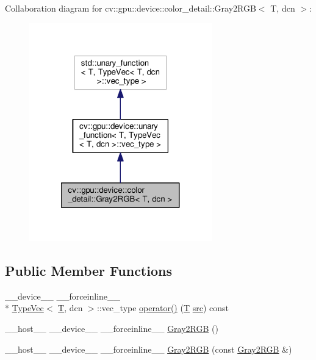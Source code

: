 Collaboration diagram for cv\-:\-:gpu\-:\-:device\-:\-:color\-\_\-detail\-:\-:Gray2\-R\-G\-B$<$ T, dcn $>$\-:\nopagebreak
\begin{figure}[H]
\begin{center}
\leavevmode
\includegraphics[width=224pt]{structcv_1_1gpu_1_1device_1_1color__detail_1_1Gray2RGB__coll__graph}
\end{center}
\end{figure}
\subsection*{Public Member Functions}
\begin{DoxyCompactItemize}
\item 
\-\_\-\-\_\-device\-\_\-\-\_\- \-\_\-\-\_\-forceinline\-\_\-\-\_\- \\*
\hyperlink{structcv_1_1gpu_1_1device_1_1TypeVec}{Type\-Vec}$<$ \hyperlink{calib3d_8hpp_a3efb9551a871ddd0463079a808916717}{T}, dcn $>$\-::vec\-\_\-type \hyperlink{structcv_1_1gpu_1_1device_1_1color__detail_1_1Gray2RGB_a84da6cd648326fdd84350d27662cdfe6}{operator()} (\hyperlink{calib3d_8hpp_a3efb9551a871ddd0463079a808916717}{T} \hyperlink{legacy_8hpp_a371cd109b74033bc4366f584edd3dacc}{src}) const 
\item 
\-\_\-\-\_\-host\-\_\-\-\_\- \-\_\-\-\_\-device\-\_\-\-\_\- \-\_\-\-\_\-forceinline\-\_\-\-\_\- \hyperlink{structcv_1_1gpu_1_1device_1_1color__detail_1_1Gray2RGB_abb29e5b425d74d18ff261a8c925508ce}{Gray2\-R\-G\-B} ()
\item 
\-\_\-\-\_\-host\-\_\-\-\_\- \-\_\-\-\_\-device\-\_\-\-\_\- \-\_\-\-\_\-forceinline\-\_\-\-\_\- \hyperlink{structcv_1_1gpu_1_1device_1_1color__detail_1_1Gray2RGB_a0f3a18911446373dda880cd41b07bc45}{Gray2\-R\-G\-B} (const \hyperlink{structcv_1_1gpu_1_1device_1_1color__detail_1_1Gray2RGB}{Gray2\-R\-G\-B} \&)
\end{DoxyCompactItemize}


